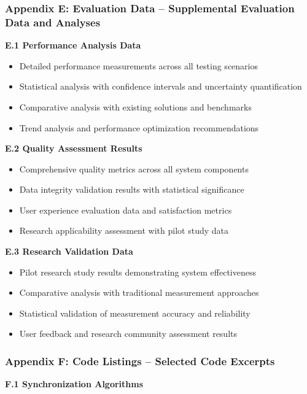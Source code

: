 \documentclass[12pt,a4paper]{report}
\begin{document}
\subsubsection{Appendix E: Evaluation Data – Supplemental Evaluation Data and Analyses}

\textbf{E.1 Performance Analysis Data}

\begin{itemize}
\item Detailed performance measurements across all testing scenarios
\item Statistical analysis with confidence intervals and uncertainty quantification
\item Comparative analysis with existing solutions and benchmarks
\item Trend analysis and performance optimization recommendations

\end{itemize}
\textbf{E.2 Quality Assessment Results}

\begin{itemize}
\item Comprehensive quality metrics across all system components
\item Data integrity validation results with statistical significance
\item User experience evaluation data and satisfaction metrics
\item Research applicability assessment with pilot study data

\end{itemize}
\textbf{E.3 Research Validation Data}

\begin{itemize}
\item Pilot research study results demonstrating system effectiveness
\item Comparative analysis with traditional measurement approaches
\item Statistical validation of measurement accuracy and reliability
\item User feedback and research community assessment results

\end{itemize}
\subsubsection{Appendix F: Code Listings – Selected Code Excerpts}

\textbf{F.1 Synchronization Algorithms}
\end{document}
